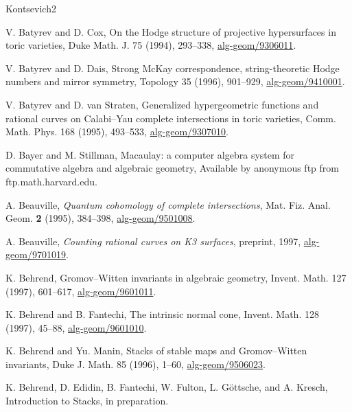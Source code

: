 \begin{thebibliography}{Kontsevich2}

\hypertarget{bib:BC}{}
V. Batyrev and D. Cox, On the Hodge structure of projective hypersurfaces
in toric varieties, Duke Math. J. 75 (1994), 293--338,
\href{https://arxiv.org/abs/alg-geom/9306011}{alg-geom/9306011}.

\hypertarget{bib:BD}{}
V. Batyrev and D. Dais, Strong McKay correspondence, string-theoretic Hodge numbers
and mirror symmetry, Topology 35 (1996), 901--929, \href{https://arxiv.org/abs/alg-geom/9410001}{alg-geom/9410001}.

\hypertarget{bib:BvS}{}
V. Batyrev and D. van Straten, Generalized hypergeometric functions
and rational curves on Calabi--Yau complete intersections in toric varieties,
Comm. Math. Phys. 168 (1995), 493--533, \href{https://arxiv.org/abs/alg-geom/9307010}{alg-geom/9307010}.

\hypertarget{bib:BS}{}
D. Bayer and M. Stillman, Macaulay: a computer algebra system for commutative algebra and algebraic geometry, Available by anonymous ftp from ftp.math.harvard.edu.

\hypertarget{bib:Beauville1}{} A. Beauville, \emph{Quantum cohomology of complete intersections}, Mat. Fiz. Anal. Geom. \textbf{2} (1995), 384--398, \href{https://arxiv.org/abs/alg-geom/9501008}{alg-geom/9501008}.

\hypertarget{bib:Beauville2}{} A. Beauville, \emph{Counting rational curves on K3 surfaces}, preprint, 1997, \href{https://arxiv.org/abs/alg-geom/9701019}{alg-geom/9701019}.

\hypertarget{bib:Behrend}{}
K. Behrend, Gromov--Witten invariants in algebraic geometry, Invent. Math. 127 (1997), 601--617, \href{https://arxiv.org/abs/alg-geom/9601011}{alg-geom/9601011}.

\hypertarget{bib:BF}{}
K. Behrend and B. Fantechi, The intrinsic normal cone, Invent. Math. 128 (1997), 45--88, \href{https://arxiv.org/abs/alg-geom/9601010}{alg-geom/9601010}.

\hypertarget{bib:BM}{}
K. Behrend and Yu. Manin, Stacks of stable maps and Gromov--Witten invariants, Duke J. Math. 85 (1996), 1--60, \href{https://arxiv.org/abs/alg-geom/9506023}{alg-geom/9506023}.

\hypertarget{bib:BEFFGK}{}
K. Behrend, D. Edidin, B. Fantechi, W. Fulton, L. Göttsche, and A. Kresch, Introduction to Stacks, in preparation.


\end{thebibliography}
